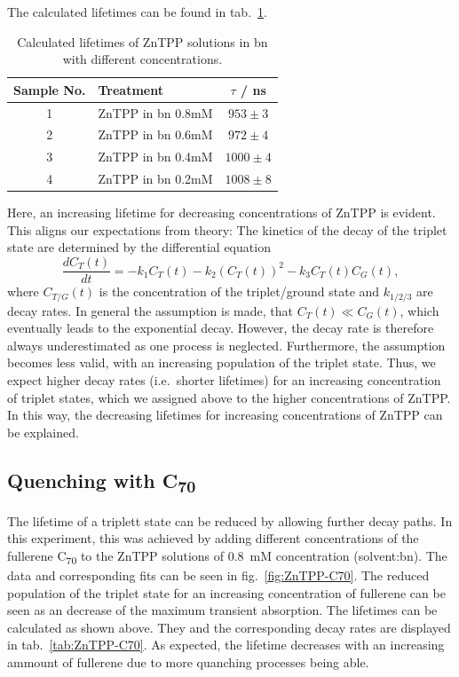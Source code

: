 The calculated lifetimes can be found in tab.~\ref{tab:lifetimesConc}.

\begin{table}[ht]
    \centering
    \begin{tabular}{clc}
        \toprule
        Sample No. &    Treatment &    $\tau$ / \si{\nano\second} \\
        \midrule
        1 &     ZnTPP in bn 0.8mM &  $953 \pm 3$ \\
        2 &     ZnTPP in bn 0.6mM &  $972 \pm 4$ \\
        3 &     ZnTPP in bn 0.4mM & $1000 \pm 4$ \\
        4 &     ZnTPP in bn 0.2mM & $1008 \pm 8$ \\
        \bottomrule
    \end{tabular}
    \caption{Calculated lifetimes of ZnTPP solutions in bn with different concentrations.}
    \label{tab:lifetimesConc}
\end{table}

Here, an increasing lifetime for decreasing concentrations of ZnTPP is evident. This aligns our expectations from theory: The kinetics of the decay of the triplet state are determined by the differential equation 
\begin{equation}
    \frac{dC_T(t)}{dt} = - k_1C_T(t) - k_2(C_T(t))^2 - k_3 C_T(t)C_G(t),
\end{equation}
where $C_{T/G}(t)$ is the concentration of the triplet/ground state and $k_{1/2/3}$ are decay rates. In general the assumption is made, that $C_T(t) \ll C_G(t)$, which eventually leads to the exponential decay. However, the decay rate is therefore always underestimated as one process is neglected. Furthermore, the assumption becomes less valid, with an increasing population of the triplet state. Thus, we expect higher decay rates (i.e.~shorter lifetimes) for an increasing concentration of triplet states, which we assigned above to the higher concentrations of ZnTPP. In this way, the decreasing lifetimes for increasing concentrations of ZnTPP can be explained.

\subsection*{Quenching with C\textsubscript{70}}
The lifetime of a triplett state can be reduced by allowing further decay paths. In this experiment, this was achieved by adding different concentrations of the fullerene C\textsubscript{70} to the ZnTPP solutions of \SI{0.8}{\milli\nauticalmile} concentration (solvent:bn). The data and corresponding fits can be seen in fig.~\ref{fig:ZnTPP-C70}. The reduced population of the triplet state for an increasing concentration of fullerene can be seen as an decrease of the maximum transient absorption. The lifetimes can be calculated as shown above. They and the corresponding decay rates are displayed in tab.~\ref{tab:ZnTPP-C70}. As expected, the lifetime decreases with an increasing ammount of fullerene due to more quanching processes being able. 

